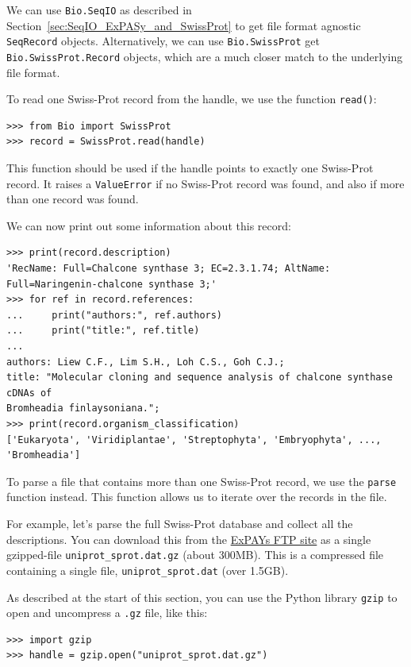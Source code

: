 \documentclass{report}
\begin{document}
We can use \verb+Bio.SeqIO+ as described in Section~\ref{sec:SeqIO_ExPASy_and_SwissProt} to get file format agnostic \verb|SeqRecord| objects.  Alternatively, we can use \verb+Bio.SwissProt+ get \verb|Bio.SwissProt.Record| objects, which are a much closer match to the underlying file format.

To read one Swiss-Prot record from the handle, we use the function \verb|read()|:
\begin{verbatim}
>>> from Bio import SwissProt
>>> record = SwissProt.read(handle)
\end{verbatim}
This function should be used if the handle points to exactly one Swiss-Prot record. It raises a \verb|ValueError| if no Swiss-Prot record was found, and also if more than one record was found.

We can now print out some information about this record:
\begin{verbatim}
>>> print(record.description)
'RecName: Full=Chalcone synthase 3; EC=2.3.1.74; AltName: Full=Naringenin-chalcone synthase 3;'
>>> for ref in record.references:
...     print("authors:", ref.authors)
...     print("title:", ref.title)
... 
authors: Liew C.F., Lim S.H., Loh C.S., Goh C.J.;
title: "Molecular cloning and sequence analysis of chalcone synthase cDNAs of
Bromheadia finlaysoniana.";
>>> print(record.organism_classification)
['Eukaryota', 'Viridiplantae', 'Streptophyta', 'Embryophyta', ..., 'Bromheadia']
\end{verbatim}

To parse a file that contains more than one Swiss-Prot record, we use the \verb|parse| function instead. This function allows us to iterate over the records in the file.

For example, let's parse the full Swiss-Prot database and collect all the descriptions.
You can download this from the \href{ftp://ftp.expasy.org/databases/uniprot/current_release/knowledgebase/complete/uniprot_sprot.dat.gz}{ExPAYs FTP site} as a single gzipped-file \verb|uniprot_sprot.dat.gz| (about 300MB).  This is a compressed file containing a single file, \verb|uniprot_sprot.dat| (over 1.5GB).

As described at the start of this section, you can use the Python library \verb|gzip| to open and uncompress a \texttt{.gz} file, like this:

\begin{verbatim}
>>> import gzip
>>> handle = gzip.open("uniprot_sprot.dat.gz")
\end{verbatim}
\end{document}

